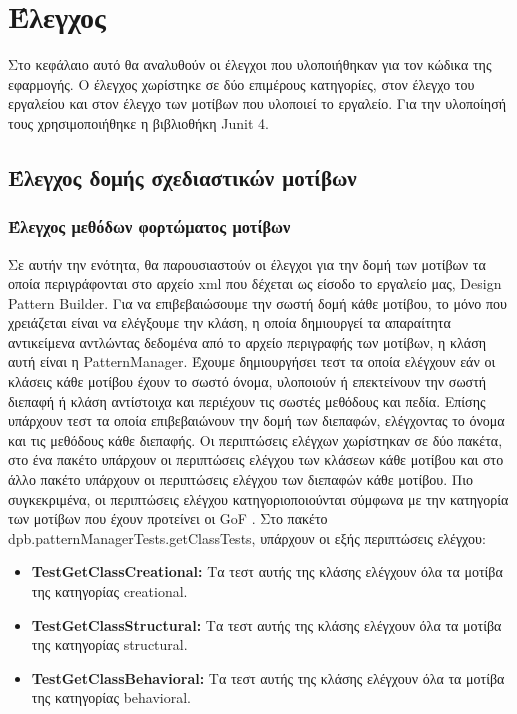 \chapter{Έλεγχος}
\label{ch:testing}
Στο κεφάλαιο αυτό θα αναλυθούν οι έλεγχοι που υλοποιήθηκαν για τον κώδικα της εφαρμογής. 
Ο έλεγχος χωρίστηκε σε δύο επιμέρους κατηγορίες, στον έλεγχο του εργαλείου και στον έλεγχο των μοτίβων που υλοποιεί το εργαλείο.
Για την υλοποίησή τους χρησιμοποιήθηκε η βιβλιοθήκη Junit 4.
\section{Έλεγχος δομής σχεδιαστικών μοτίβων}
\label{sec:patternTesting}
\subsection{Έλεγχος μεθόδων φορτώματος μοτίβων}
\label{subsec:patternManagerTesting}
Σε αυτήν την ενότητα, θα παρουσιαστούν οι έλεγχοι για την δομή των μοτίβων τα οποία περιγράφονται στο αρχείο xml που δέχεται ως είσοδο 
το εργαλείο μας, Design Pattern Builder.
Για να επιβεβαιώσουμε την σωστή δομή κάθε μοτίβου, το μόνο που χρειάζεται είναι να ελέγξουμε την κλάση, η οποία δημιουργεί 
τα απαραίτητα αντικείμενα αντλώντας δεδομένα από το αρχείο περιγραφής των μοτίβων, η κλάση αυτή είναι η PatternManager.
Έχουμε δημιουργήσει τεστ τα οποία ελέγχουν εάν οι κλάσεις κάθε μοτίβου έχουν το σωστό όνομα, υλοποιούν ή επεκτείνουν την σωστή 
διεπαφή ή κλάση αντίστοιχα και περιέχουν τις σωστές μεθόδους και πεδία. Επίσης υπάρχουν τεστ τα οποία επιβεβαιώνουν την δομή των 
διεπαφών, ελέγχοντας το όνομα και τις μεθόδους κάθε διεπαφής. Οι περιπτώσεις ελέγχων χωρίστηκαν σε δύο πακέτα, 
στο ένα πακέτο υπάρχουν οι περιπτώσεις ελέγχου των κλάσεων κάθε μοτίβου και στο άλλο πακέτο υπάρχουν οι περιπτώσεις ελέγχου 
των διεπαφών κάθε μοτίβου. Πιο συγκεκριμένα, οι περιπτώσεις ελέγχου κατηγοριοποιούνται σύμφωνα με την 
κατηγορία των μοτίβων που έχουν προτείνει οι GoF \cite{GoF}. Στο πακέτο dpb.patternManagerTests.getClassTests, 
υπάρχουν οι εξής περιπτώσεις ελέγχου:
\begin{itemize}
    \item \textbf{TestGetClassCreational:} Τα τεστ αυτής της κλάσης ελέγχουν όλα τα μοτίβα της κατηγορίας creational.
    \item \textbf{TestGetClassStructural:} Τα τεστ αυτής της κλάσης ελέγχουν όλα τα μοτίβα της κατηγορίας structural.
    \item \textbf{TestGetClassBehavioral:} Τα τεστ αυτής της κλάσης ελέγχουν όλα τα μοτίβα της κατηγορίας behavioral.
\end{itemize}
